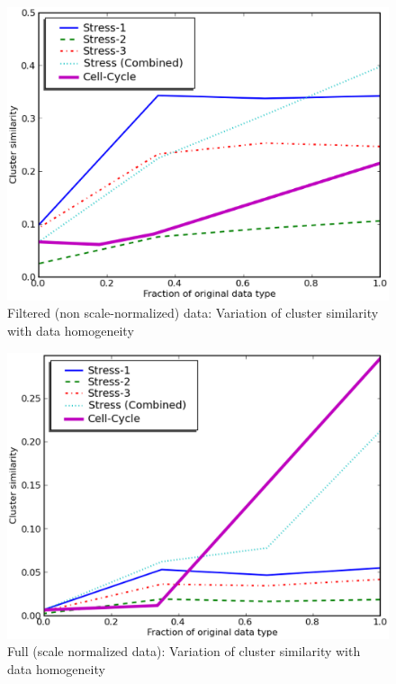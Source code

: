\begin{figure}[t]\centering
\includegraphics[scale=0.6]{chapter1/plot_filtered.eps}
\caption{Filtered (non scale-normalized) data: Variation of cluster similarity with data homogeneity}
\label{graphs:all:filtered}
\end{figure}

\begin{figure}[t]\centering
\includegraphics[scale=0.6]{chapter1/plot_norm.eps}
\caption{Full (scale normalized data): Variation of cluster similarity with data homogeneity}
\label{graphs:all:norm}
\end{figure}

